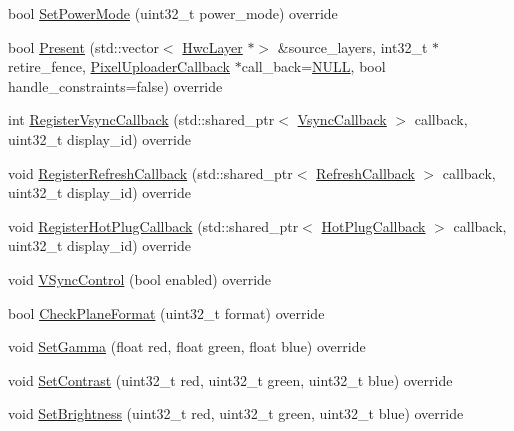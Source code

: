 \begin{DoxyCompactItemize}
bool \mbox{\hyperlink{classhwcomposer_1_1NestedDisplay_a4cab919931af541339c97f3b2d8b032d}{Set\+Power\+Mode}} (uint32\+\_\+t power\+\_\+mode) override
\item 
bool \mbox{\hyperlink{classhwcomposer_1_1NestedDisplay_af7983c8f6bafff1ab2077f7b3d38a0de}{Present}} (std\+::vector$<$ \mbox{\hyperlink{structhwcomposer_1_1HwcLayer}{Hwc\+Layer}} $\ast$$>$ \&source\+\_\+layers, int32\+\_\+t $\ast$retire\+\_\+fence, \mbox{\hyperlink{classhwcomposer_1_1PixelUploaderCallback}{Pixel\+Uploader\+Callback}} $\ast$call\+\_\+back=\mbox{\hyperlink{alios_2platformdefines_8h_a070d2ce7b6bb7e5c05602aa8c308d0c4}{N\+U\+LL}}, bool handle\+\_\+constraints=false) override
\item 
int \mbox{\hyperlink{classhwcomposer_1_1NestedDisplay_a09a16cff82bc26e862eaa2e8bb9cbe67}{Register\+Vsync\+Callback}} (std\+::shared\+\_\+ptr$<$ \mbox{\hyperlink{classhwcomposer_1_1VsyncCallback}{Vsync\+Callback}} $>$ callback, uint32\+\_\+t display\+\_\+id) override
\item 
void \mbox{\hyperlink{classhwcomposer_1_1NestedDisplay_a821c1f2bf3622c4889e8c84f2a6935d3}{Register\+Refresh\+Callback}} (std\+::shared\+\_\+ptr$<$ \mbox{\hyperlink{classhwcomposer_1_1RefreshCallback}{Refresh\+Callback}} $>$ callback, uint32\+\_\+t display\+\_\+id) override
\item 
void \mbox{\hyperlink{classhwcomposer_1_1NestedDisplay_a0e9948e4763ef5abcdfcd12e42ef7267}{Register\+Hot\+Plug\+Callback}} (std\+::shared\+\_\+ptr$<$ \mbox{\hyperlink{classhwcomposer_1_1HotPlugCallback}{Hot\+Plug\+Callback}} $>$ callback, uint32\+\_\+t display\+\_\+id) override
\item 
void \mbox{\hyperlink{classhwcomposer_1_1NestedDisplay_ab6b0f8f36573b7c347805131734f0b47}{V\+Sync\+Control}} (bool enabled) override
\item 
bool \mbox{\hyperlink{classhwcomposer_1_1NestedDisplay_a5e44d76d34b86354540abbee20ab046d}{Check\+Plane\+Format}} (uint32\+\_\+t format) override
\item 
void \mbox{\hyperlink{classhwcomposer_1_1NestedDisplay_ad43575ee1695666a74cf5cb44d64f98e}{Set\+Gamma}} (float red, float green, float blue) override
\item 
void \mbox{\hyperlink{classhwcomposer_1_1NestedDisplay_aa3509b6c817d6ff091e3cf5000d64bc3}{Set\+Contrast}} (uint32\+\_\+t red, uint32\+\_\+t green, uint32\+\_\+t blue) override
\item 
void \mbox{\hyperlink{classhwcomposer_1_1NestedDisplay_ada28a82438946b62966b8e3fb4ad3e9d}{Set\+Brightness}} (uint32\+\_\+t red, uint32\+\_\+t green, uint32\+\_\+t blue) override
$$
\end{DoxyCompactItemize}
